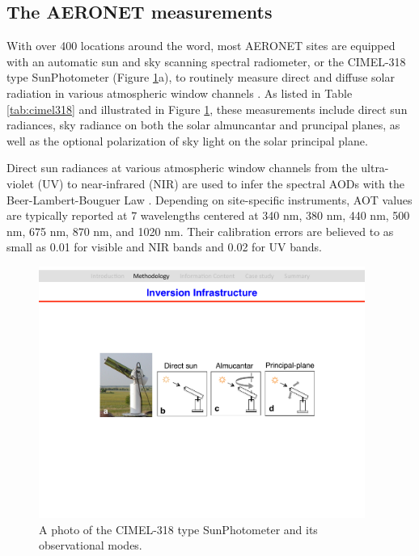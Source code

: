 \subsection{The AERONET measurements}

With over 400 locations around the word, most AERONET sites are equipped with
an automatic sun and sky scanning spectral radiometer, or the CIMEL-318 type
SunPhotometer (Figure \ref{fig:cimel318}a), to routinely measure direct and 
diffuse solar radiation in various atmospheric window channels \citep{Holben98}. 
As listed in Table \ref{tab:cimel318} and illustrated in Figure \ref{fig:cimel318}, these
measurements include direct sun radiances, sky radiance on both the solar
almuncantar and pruncipal planes, as well as the optional polarization of sky
light on the solar principal plane.

Direct sun radiances at various atmospheric window channels from the
ultra-violet (UV) to near-infrared (NIR) are used to infer the spectral AODs with the
Beer-Lambert-Bouguer Law \citep{Holben98,Smirnov00}. Depending on site-specific
instruments, AOT values are typically reported at 7 wavelengths centered at 340
nm, 380 nm, 440 nm, 500 nm, 675 nm, 870 nm, and 1020 nm. Their calibration
errors are believed to as small as 0.01 for visible and NIR bands and 0.02 for
UV bands.

\begin{figure}[t]
  \centering
  \includegraphics[width={0.95\textwidth}]{figures/cimel318.pdf}
  \caption{A photo of the CIMEL-318 type SunPhotometer and its observational 
modes.}
  \label{fig:cimel318}
\end{figure}

